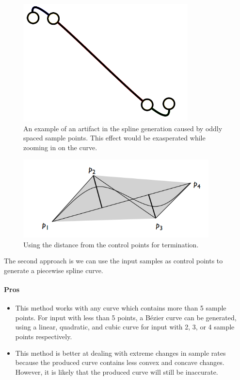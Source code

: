 \documentclass[12pt]{report}
\begin{document}
\begin{center}
\begin{figure}
\begin{center}
\includegraphics[width=0.8\textwidth]{splineartifact}
\end{center}
\caption{An example of an artifact in the spline generation caused by oddly spaced sample points. This effect would be exasperated while zooming in on the curve.}
\end{figure}
\begin{figure}
\begin{center}
\includegraphics[width=0.9\textwidth]{terminationbspline}
\end{center}
\caption{Using the distance from the control points for termination.}
\end{figure}
\end{center}

The second approach is we can use the input samples as control points to generate a piecewise spline curve. 

\paragraph{Pros}

\begin{itemize}
\item This method works with any curve which contains more than 5 sample points.
For input with less than 5 points, a Bézier curve can be generated, using a linear, quadratic, and cubic curve for input with 2, 3, or 4 sample points respectively.
\item This method is better at dealing with extreme changes in sample rates because the produced curve contains less convex and concave changes. However, it is likely that the produced curve will still be inaccurate.
\end{itemize}
\end{document}
